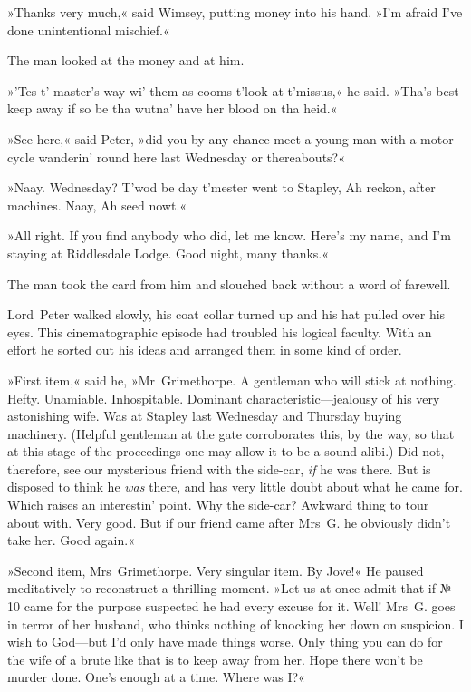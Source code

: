 »Thanks very much,« said Wimsey, putting money into his hand. »I'm afraid I've done unintentional mischief.«

The man looked at the money and at him.

»'Tes t' master's way wi' them as cooms t'look at t'missus,« he said.  »Tha's best keep away if so be tha wutna' have her blood on tha heid.«

»See here,« said Peter, »did you by any chance meet a young man with a motor-cycle wanderin' round here last Wednesday or thereabouts?«

»Naay. Wednesday? T'wod be day t'mester went to Stapley, Ah reckon, after machines. Naay, Ah seed nowt.«

»All right. If you find anybody who did, let me know. Here's my name, and I'm staying at Riddlesdale Lodge. Good night, many thanks.«

The man took the card from him and slouched back without a word of farewell.

\divider

Lord~Peter walked slowly, his coat collar turned up and his hat pulled over his eyes. This cinematographic episode had troubled his logical faculty. With an effort he sorted out his ideas and arranged them in some kind of order.

»First item,« said he, »Mr~Grimethorpe. A gentleman who will stick at nothing. Hefty. Unamiable. Inhospitable. Dominant characteristic—jealousy of his very astonishing wife. Was at Stapley last Wednesday and Thursday buying machinery. (Helpful gentleman at the gate corroborates this, by the way, so that at this stage of the proceedings one may allow it to be a sound alibi.) Did not, therefore, see our mysterious friend with the side-car, \textit{if} he was there. But is disposed to think he \textit{was} there, and has very little doubt about what he came for. Which raises an interestin' point. Why the side-car?  Awkward thing to tour about with. Very good. But if our friend came after Mrs~G\@. he obviously didn't take her. Good again.«

»Second item, Mrs~Grimethorpe. Very singular item. By Jove!« He paused meditatively to reconstruct a thrilling moment. »Let us at once admit that if № 10 came for the purpose suspected he had every excuse for it. Well! Mrs~G\@. goes in terror of her husband, who thinks nothing of knocking her down on suspicion. I wish to God—but I'd only have made things worse. Only thing you can do for the wife of a brute like that is to keep away from her. Hope there won't be murder done. One's enough at a time. Where was I\@?«

